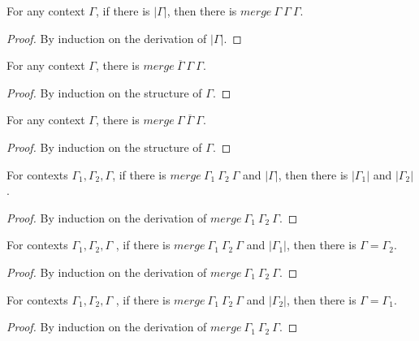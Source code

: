 \documentclass[sigplan,screen,review,anonymous]{acmart}
\newcommand{\pure}[1]{|#1|}
\newcommand{\mrg}[3]{merge\ {#1}\ {#2}\ {#3}}
\begin{document}
\begin{lemma}\label{mergepure}
  For any context $\Gamma$, if there is $\pure{\Gamma}$, then there is $\mrg{\Gamma}{\Gamma}{\Gamma}$.
\end{lemma}
\begin{proof}
  By induction on the derivation of $\pure{\Gamma}$.
\end{proof}

\begin{lemma}\label{mergere1}
  For any context $\Gamma$, there is $\mrg{\overline{\Gamma}}{\Gamma}{\Gamma}$.
\end{lemma}
\begin{proof}
  By induction on the structure of $\Gamma$.
\end{proof}

\begin{lemma}\label{mergere2}
  For any context $\Gamma$, there is $\mrg{\Gamma}{\overline{\Gamma}}{\Gamma}$.
\end{lemma}
\begin{proof}
  By induction on the structure of $\Gamma$.
\end{proof}

\begin{lemma}\label{mergepureinv}
  For contexts $\Gamma_1, \Gamma_2, \Gamma$, if there is $\mrg{\Gamma_1}{\Gamma_2}{\Gamma}$ and $\pure{\Gamma}$, then there is $\pure{\Gamma_1}$ and $\pure{\Gamma_2}$.
\end{lemma}
\begin{proof}
  By induction on the derivation of $\mrg{\Gamma_1}{\Gamma_2}{\Gamma}$.
\end{proof}

\begin{lemma}\label{mergepure1}
  For contexts $\Gamma_1, \Gamma_2, \Gamma$ , if there is $\mrg{\Gamma_1}{\Gamma_2}{\Gamma}$ and $\pure{\Gamma_1}$, then there is $\Gamma = \Gamma_2$.
\end{lemma}
\begin{proof}
  By induction on the derivation of $\mrg{\Gamma_1}{\Gamma_2}{\Gamma}$.
\end{proof}

\begin{lemma}\label{mergepure2}
  For contexts $\Gamma_1, \Gamma_2, \Gamma$ , if there is $\mrg{\Gamma_1}{\Gamma_2}{\Gamma}$ and $\pure{\Gamma_2}$, then there is $\Gamma = \Gamma_1$.
\end{lemma}
\begin{proof}
  By induction on the derivation of $\mrg{\Gamma_1}{\Gamma_2}{\Gamma}$.
\end{proof}
\end{document}
